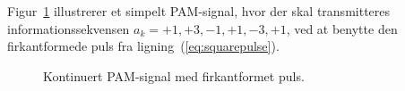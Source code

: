 \documentclass[dvips,11pt,a4paper]{article}
\begin{document}
Figur~\ref{fig:pam001a} illustrerer et simpelt PAM-signal, hvor der skal transmitteres informationssekvensen $a_{k} = +1,+3,-1,+1,-3,+1$, ved at benytte den firkantformede puls fra ligning~(\ref{eq:squarepulse}).
\begin{figure}[htbp]
\centering
{}
\caption{\label{fig:pam001a}Kontinuert PAM-signal med firkantformet puls.}
\end{figure}
\end{document}
